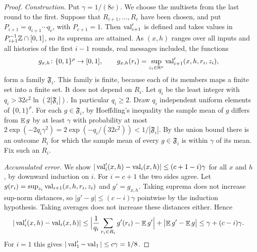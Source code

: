 \begin{proof}
\emph{Construction.}
Put $\gamma=1/(8c)$.
We choose the multisets from the last round to the first.
Suppose that $R_{i+1},\dots,R_c$ have been chosen, and put $P_{i+1}=q_{i+1}\cdots q_c$, with $P_{c+1}=1$.
Then $\operatorname{val}'_{i+1}$ is defined and takes values in $P_{i+1}^{-1}\mathbb{Z}\cap[0,1]$, so its suprema are attained.
As $(x,h)$ ranges over all inputs and all histories of the first $i-1$ rounds, real messages included, the functions
\[
g_{x,h}\colon\{0,1\}^\rho\to[0,1],\qquad g_{x,h}(r_i)=\sup_{z_i\in\mathbb{R}^\mu}\operatorname{val}'_{i+1}(x,h,r_i,z_i),
\]
form a family $\mathfrak F_i$.
This family is finite, because each of its members maps a finite set into a finite set.
It does not depend on $R_i$.
Let $q_i$ be the least integer with $q_i>32c^2\ln(2|\mathfrak F_i|)$.
In particular $q_i\ge2$.
Draw $q_i$ independent uniform elements of $\{0,1\}^\rho$.
For each $g\in\mathfrak F_i$, by Hoeffding's inequality \cite{Hoe63} the sample mean of $g$ differs from $\mathop{\mathbb{E}} g$ by at least $\gamma$ with probability at most $2\exp(-2q_i\gamma^2)=2\exp(-q_i/(32c^2))<1/|\mathfrak F_i|$.
By the union bound there is an outcome $R_i$ for which the sample mean of every $g\in\mathfrak F_i$ is within $\gamma$ of its mean.
Fix such an $R_i$.

\emph{Accumulated error.}
We show $|\operatorname{val}'_i(x,h)-\operatorname{val}_i(x,h)|\le(c+1-i)\gamma$ for all $x$ and $h$, by downward induction on $i$.
For $i=c+1$ the two sides agree.
Let $g(r_i)=\sup_{z_i}\operatorname{val}_{i+1}(x,h,r_i,z_i)$ and $g'=g_{x,h}$.
Taking suprema does not increase sup-norm distances, so $|g'-g|\le(c-i)\gamma$ pointwise by the induction hypothesis.
Taking averages does not increase these distances either.
Hence
\[
|\operatorname{val}'_i(x,h)-\operatorname{val}_i(x,h)|\le\Bigl|\frac1{q_i}\sum_{r_i\in R_i}g'(r_i)-\mathop{\mathbb{E}} g'\Bigr|+\bigl|\mathop{\mathbb{E}} g'-\mathop{\mathbb{E}} g\bigr|\le\gamma+(c-i)\gamma .
\]
For $i=1$ this gives $|\operatorname{val}'_1-\operatorname{val}_1|\le c\gamma=1/8$.


\end{proof}

